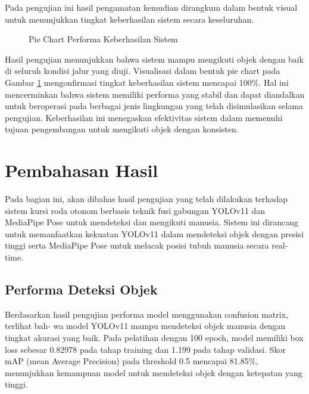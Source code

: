 Pada pengujian ini hasil pengamatan kemudian dirangkum dalam bentuk visual untuk menunjukkan tingkat keberhasilan sistem secara keseluruhan.

\begin{figure}[H]
    \centering
    \caption{Pie Chart Performa Keberhasilan Sistem}
    \label{fig:piechart}
\end{figure}

Hasil pengujian menunjukkan bahwa sistem mampu mengikuti objek dengan baik di seluruh kondisi jalur yang diuji. Visualisasi dalam bentuk pie chart pada Gambar \ref{fig:piechart} mengonfirmasi tingkat keberhasilan sistem mencapai 100\%. Hal ini mencerminkan bahwa sistem memiliki performa yang stabil dan dapat diandalkan untuk beroperasi pada berbagai jenis lingkungan yang telah disimulasikan selama pengujian. Keberhasilan ini menegaskan efektivitas sistem dalam memenuhi tujuan pengembangan untuk mengikuti objek dengan konsisten.

\section{Pembahasan Hasil}
\label{sec:pembahasanhasil}

Pada bagian ini, akan dibahas hasil pengujian yang telah dilakukan terhadap sistem kursi roda otonom berbasis teknik fusi gabungan YOLOv11 dan MediaPipe Pose untuk mendeteksi dan mengikuti manusia. Sistem ini dirancang untuk memanfaatkan kekuatan YOLOv11 dalam mendeteksi objek dengan presisi tinggi serta MediaPipe Pose untuk melacak posisi tubuh manusia secara real-time.

\subsection{Performa Deteksi Objek}
\label{sec:performadeteksiobjek}

Berdasarkan hasil pengujian performa model menggunakan confusion matrix, terlihat bah- wa model YOLOv11 mampu mendeteksi objek manusia dengan tingkat akurasi yang baik. Pada pelatihan dengan 100 epoch, model memiliki box loss sebesar 0.82978 pada tahap training dan 1.199 pada tahap validasi. Skor mAP (mean Average Precision) pada threshold 0.5 mencapai 81.85\%, menunjukkan kemampuan model untuk mendeteksi objek dengan ketepatan yang tinggi.

